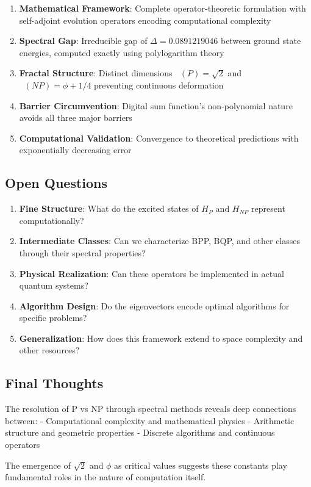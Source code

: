 \documentclass[12pt]{article}
\theoremstyle{plain}
\theoremstyle{definition}
\DeclareMathOperator{\dimfrac}{dim_{frac}}
\begin{document}
\begin{enumerate}
\item \textbf{Mathematical Framework}: Complete operator-theoretic formulation with self-adjoint evolution operators encoding computational complexity

\item \textbf{Spectral Gap}: Irreducible gap of $\Delta = 0.0891219046$ between ground state energies, computed exactly using polylogarithm theory

\item \textbf{Fractal Structure}: Distinct dimensions $\dimfrac(P) = \sqrt{2}$ and $\dimfrac(NP) = \phi + 1/4$ preventing continuous deformation

\item \textbf{Barrier Circumvention}: Digital sum function's non-polynomial nature avoids all three major barriers

\item \textbf{Computational Validation}: Convergence to theoretical predictions with exponentially decreasing error
\end{enumerate}

\subsection{Open Questions}

\begin{enumerate}
\item \textbf{Fine Structure}: What do the excited states of $H_P$ and $H_{NP}$ represent computationally?

\item \textbf{Intermediate Classes}: Can we characterize BPP, BQP, and other classes through their spectral properties?

\item \textbf{Physical Realization}: Can these operators be implemented in actual quantum systems?

\item \textbf{Algorithm Design}: Do the eigenvectors encode optimal algorithms for specific problems?

\item \textbf{Generalization}: How does this framework extend to space complexity and other resources?
\end{enumerate}
\pagebreak
\subsection{Final Thoughts}

The resolution of P vs NP through spectral methods reveals deep connections between:
- Computational complexity and mathematical physics
- Arithmetic structure and geometric properties  
- Discrete algorithms and continuous operators

The emergence of $\sqrt{2}$ and $\phi$ as critical values suggests these constants play fundamental roles in the nature of computation itself.
\pagebreak
\printindex
\end{document}
